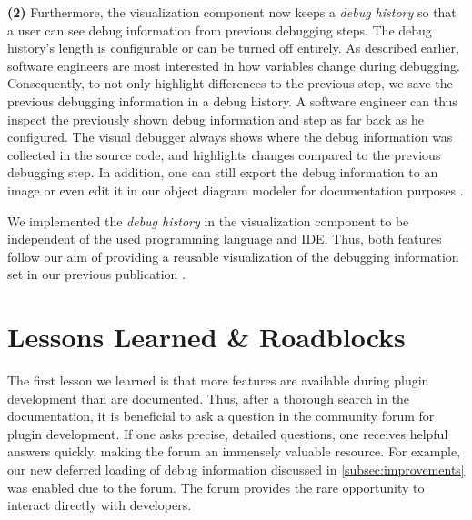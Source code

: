 \documentclass[sigconf]{acmart}
\begin{document}
\textbf{(2)} Furthermore, the visualization component now keeps a \textit{debug history} so that a user can see debug information from previous debugging steps.
The debug history's length is configurable or can be turned off entirely.
As described earlier, software engineers are most interested in how variables change during debugging.
Consequently, to not only highlight differences to the previous step, we save the previous debugging information in a debug history.
A software engineer can thus inspect the previously shown debug information and step as far back as he configured.
The visual debugger always shows where the debug information was collected in the source code, and highlights changes compared to the previous debugging step.
In addition, one can still export the debug information to an image or even edit it in our object diagram modeler \cite{timkrauterObjectdiagramjs2023} for documentation purposes \cite{krauterVisualDebuggerTool2022}.

We implemented the \textit{debug history} in the visualization component to be independent of the used programming language and IDE.
Thus, both features follow our aim of providing a reusable visualization of the debugging information set in our previous publication \cite{krauterVisualDebuggerTool2022}.

\section{Lessons Learned \& Roadblocks} \label{sec:lessonsLearned}
The first lesson we learned is that more features are available during plugin development than are documented.
Thus, after a thorough search in the documentation, it is beneficial to ask a question in the community forum for plugin development.
If one asks precise, detailed questions, one receives helpful answers quickly, making the forum an immensely valuable resource.
For example, our new deferred loading of debug information discussed in \autoref{subsec:improvements} was enabled due to the \intellij{} forum.
The forum provides the rare opportunity to interact directly with \intellij{} developers.

\end{document}
